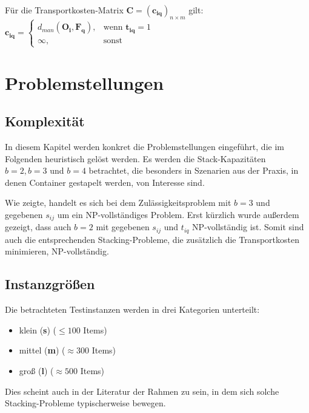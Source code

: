 Für die Transportkosten-Matrix $\boldsymbol{C} = (\boldsymbol{c_{iq}})_{n \times m}$ gilt:\newline
$
    \boldsymbol{c_{iq}} =
\begin{cases}
    d_{man}(\boldsymbol{O_i}, \boldsymbol{F_q}), & \text{wenn $\boldsymbol{t_{iq}} = 1$}\\
    \infty, & \text{sonst}
\end{cases}
$

\pagebreak

\section{Problemstellungen}
\label{sec:problem_settings}

\subsection{Komplexität}
\label{sec:complexity}

In diesem Kapitel werden konkret die Problemstellungen eingeführt, die im Folgenden heuristisch gelöst werden.
Es werden die Stack-Kapazitäten $b=2, b=3 $ und $ b=4$ betrachtet, die besonders in Szenarien aus der Praxis, in denen
Container gestapelt werden, von Interesse sind.

Wie \cite{Bruns2015} zeigte, handelt es sich bei dem Zulässigkeitsproblem mit $b=3$ und gegebenen $s_{ij}$ um
ein NP-vollständiges Problem. Erst kürzlich wurde außerdem gezeigt, dass auch $b=2$ mit gegebenen $s_{ij}$ und $t_{iq}$
NP-vollständig ist. Somit sind auch die entsprechenden Stacking-Probleme, die zusätzlich die Transportkosten minimieren, NP-vollständig.

\subsection{Instanzgrößen}
\label{sec:instance_sizes}

Die betrachteten Testinstanzen werden in drei Kategorien unterteilt:
\begin{itemize}
  \item klein (\textbf{s}) ($\leq 100$ Items)
  \item mittel (\textbf{m}) ($\approx 300$ Items)
  \item groß (\textbf{l}) ($\approx 500$ Items)\newline
\end{itemize}
Dies scheint auch in der Literatur der Rahmen zu sein, in dem sich solche Stacking-Probleme typischerweise bewegen.

